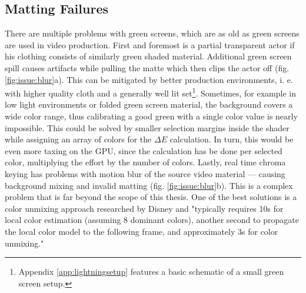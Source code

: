 \subsection{Matting Failures}

There are multiple problems with green screens, which are as old as green 
screens are used in video production. First and foremost is a partial 
transparent actor if his clothing consists of similarly green shaded material.
\newline
Additional green screen spill causes artifacts while pulling the matte which 
then clips the actor off (fig. \ref{fig:issue:blur}a). This can be mitigated 
by better production 
environments, i. e. with higher quality cloth and a generally well lit 
set\footnote{Appendix \ref{app:lightningsetup} features a basic schematic of a 
small green screen setup.}.
\newline
Sometimes, for example in low light environments or folded green screen 
material, the background covers a wide color range, thus calibrating a good 
green with a single color value is nearly impossible. This could be solved by 
smaller selection margins inside the shader while assigning an array of colors 
for the $\Delta E$ calculation. In turn, this would be even more taxing on the 
GPU, since the calculation has be done per selected color, multiplying the 
effort by the number of colors.
\newline
Lastly, real time chroma keying has problems with motion blur of the source 
video material --- causing background mixing and invalid matting (fig. 
\ref{fig:issue:blur}b). This is a complex problem that is far beyond the scope 
of this thesis. One of the best solutions is a color unmixing approach 
researched by Disney and "typically requires 10s for local color estimation 
(assuming 8 dominant colors), another second to propagate the local color model 
to the following frame, and approximately 3s for color unmixing." 
\cite{disney:unmixing:2017}

